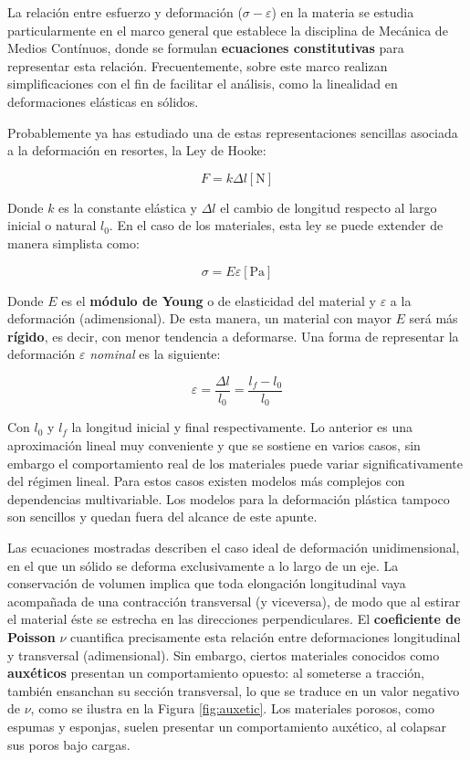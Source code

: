 La relación entre esfuerzo y deformación ($\sigma - \varepsilon$) en la materia se estudia particularmente en el marco general que establece la disciplina de Mecánica de Medios Contínuos, donde se formulan \textbf{ecuaciones constitutivas} para representar esta relación. Frecuentemente, sobre este marco realizan simplificaciones con el fin de facilitar el análisis, como la linealidad en deformaciones elásticas en sólidos. 

Probablemente ya has estudiado una de estas representaciones sencillas asociada a la deformación en resortes, la Ley de Hooke:

\begin{equation}
    F=k\Delta l \mathrm{[N]}
\end{equation}

Donde $k$ es la constante elástica y $\Delta l$ el cambio de longitud respecto al largo inicial o natural $l_{0}$. En el caso de los materiales, esta ley se puede extender de manera simplista como:

\begin{equation}
    \sigma=E\varepsilon \mathrm{[Pa]}
\end{equation}

Donde $E$ es el \textbf{módulo de Young} o de elasticidad del material y $\varepsilon$ a la deformación (adimensional). De esta manera, un material con mayor $E$ será más \textbf{rígido}, es decir, con menor tendencia a deformarse. Una forma de representar la deformación $\varepsilon$ \textit{nominal} es la siguiente:

\begin{equation}
    \varepsilon = \frac{\Delta l}{l_{0}}=\frac{l_{f}-l_{0}}{l_{0}}
\end{equation}

Con $l_{0}$ y $l_{f}$ la longitud inicial y final respectivamente. Lo anterior es una aproximación lineal muy conveniente y que se sostiene en varios casos, sin embargo el comportamiento real de los materiales puede variar significativamente del régimen lineal. Para estos casos existen modelos más complejos con dependencias multivariable. Los modelos para la deformación plástica tampoco son sencillos y quedan fuera del alcance de este apunte.

Las ecuaciones mostradas describen el caso ideal de deformación unidimensional, en el que un sólido se deforma exclusivamente a lo largo de un eje. La conservación de volumen implica que toda elongación longitudinal vaya acompañada de una contracción transversal (y viceversa), de modo que al estirar el material éste se estrecha en las direcciones perpendiculares. El \textbf{coeficiente de Poisson} $\nu$ cuantifica precisamente esta relación entre deformaciones longitudinal y transversal (adimensional). Sin embargo, ciertos materiales conocidos como \textbf{auxéticos} presentan un comportamiento opuesto: al someterse a tracción, también ensanchan su sección transversal, lo que se traduce en un valor negativo de $\nu$, como se ilustra en la Figura \ref{fig:auxetic}. Los materiales porosos, como espumas y esponjas, suelen presentar un comportamiento auxético, al colapsar sus poros bajo cargas.

